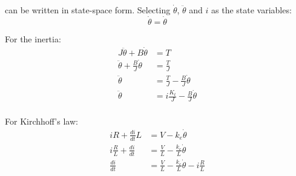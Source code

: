 \documentclass[11pt]{article}
\begin{document}
can be written in state-space form.
Selecting $\dot{\theta}$, $\ddot{\theta}$ and $i$ as the state variables:
\begin{equation}
  \dot{\theta} = \dot{\theta}
\end{equation}

For the inertia:
\begin{subequations}
  \begin{align}
    J\ddot{\theta} + B\dot{\theta} &= T \\
    \ddot{\theta} + \frac{B}{J}\dot{\theta} &= \frac{T}{J} \\
    \ddot{\theta} &= \frac{T}{J} - \frac{B}{J}\dot{\theta} \\
    \ddot{\theta} &= i\frac{K_t}{J} - \frac{B}{J}\dot{\theta} \\
  \end{align}
\end{subequations}

For Kirchhoff's law:
\begin{subequations}
  \begin{align}
    iR + \frac{di}{dt}L &= V - k_e\dot{\theta} \\
    i\frac{R}{L} + \frac{di}{dt} &= \frac{V}{L} - \frac{k_e}{L}\dot{\theta} \\
    \frac{di}{dt} &= \frac{V}{L} - \frac{k_e}{L}\dot{\theta} - i\frac{R}{L}\\
  \end{align}
\end{subequations}
\end{document}
